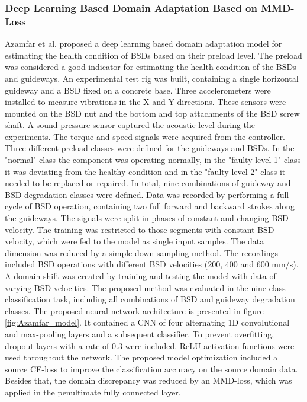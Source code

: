\subsubsection{Deep Learning Based Domain Adaptation Based on MMD-Loss}
Azamfar et al. \cite{AZAMFAR2020103932} proposed a deep learning based domain adaptation model for estimating the health condition of BSDs based on their preload level. The preload was considered a good indicator for estimating the health condition of the BSDs and guideways. An experimental test rig was built, containing a single horizontal guideway and a BSD fixed on a concrete base. Three accelerometers were installed to measure vibrations in the X and Y directions. These sensors were mounted on the BSD nut and the bottom and top attachments of the BSD screw shaft. A sound pressure sensor captured the acoustic level during the experiments. The torque and speed signals were acquired from the controller. Three different preload classes were defined for the guideways and BSDs. In the "normal" class the component was operating normally, in the "faulty level 1" class it was deviating from the healthy condition and in the "faulty level 2" class it needed to be replaced or repaired. In total, nine combinations of guideway and BSD degradation classes were defined. Data was recorded by performing a full cycle of BSD operation, containing two full forward and backward strokes along the guideways. The signals were split in phases of constant and changing BSD velocity. The training was restricted to those segments with constant BSD velocity, which were fed to the model as single input samples. The data dimension was reduced by a simple down-sampling method. The recordings included BSD operations with different BSD velocities (200, 400 and 600 mm/s). A domain shift was created by training and testing the model with data of varying BSD velocities. The proposed method was evaluated in the nine-class classification task, including all combinations of BSD and guideway degradation classes. The proposed neural network architecture is presented in figure \ref{fig:Azamfar_model}. It contained a CNN of four alternating 1D convolutional and max-pooling layers and a subsequent classifier. To prevent overfitting, dropout layers with a rate of 0.3 were included. ReLU activation functions were used throughout the network. The proposed model optimization included a source CE-loss to improve the classification accuracy on the source domain data. Besides that, the domain discrepancy was reduced by an MMD-loss, which was applied in the penultimate fully connected layer. 


